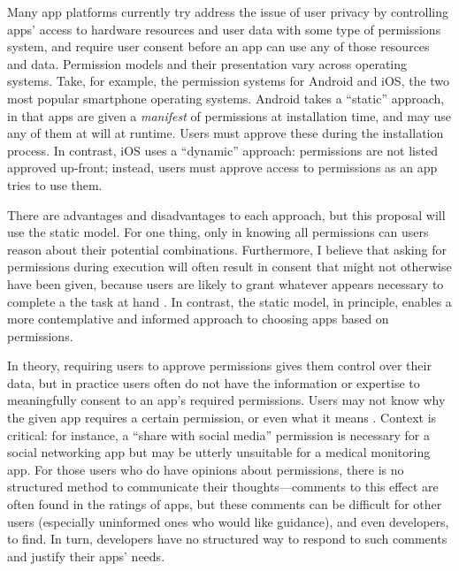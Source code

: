 \documentclass[11pt]{article}
\begin{document}
Many app platforms currently try address the issue of
user privacy by controlling apps' access to hardware resources 
and user data with some type of permissions system,
and require user consent before an app can use any
of those resources and data. Permission models and their presentation 
vary across operating systems. Take, for example, the permission systems
for Android and iOS, the two most popular smartphone operating systems.  
Android takes a ``static'' approach, in that apps are given a
\emph{manifest} of
permissions at installation time, and may use any of them at will at runtime.
Users must approve these during the installation
process. In contrast, iOS uses a ``dynamic''
approach: permissions are not listed approved up-front; instead, users must
approve access to permissions as an app tries to use them.

There are advantages and disadvantages to each approach, but
this proposal will use the static model. For one thing, only in 
knowing all permissions can users reason about their potential
combinations. Furthermore, I believe that asking for permissions
during execution will often result in consent that might not otherwise
have been given, because users are likely to grant whatever appears
necessary to complete a the task at hand \cite{phisher-wanings-SIGCHI08}. 
In contrast, the static
model, in principle, enables a more contemplative and
informed approach to choosing apps based on permissions.

In theory, requiring users to approve permissions gives them control over their 
data, but in practice users often do not have the 
information or expertise to meaningfully consent to an 
app's required permissions. Users may not
know why the given app requires a certain permission, or
even what it means \cite{android-attention-SOUPS12}. 
Context is critical:
for instance, 
a ``share with social media'' permission is necessary for a social
networking app but may be utterly
unsuitable for a medical monitoring app. 
For those users who do have opinions about permissions, 
there is no structured method to
communicate their thoughts---comments to this effect are often found in
the ratings of apps, but these comments can be difficult for other
users (especially uninformed ones who would like guidance), and even
developers, to find. In turn, developers have no structured way to
respond to such comments and justify their apps' needs.
\end{document}
